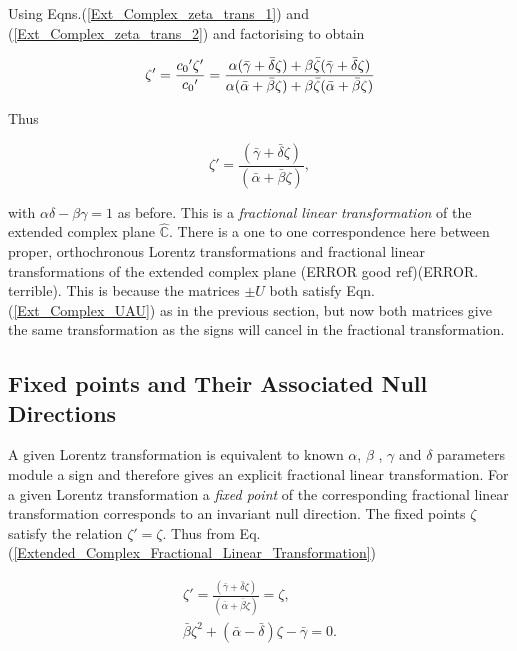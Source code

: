 \noindent Using Eqns.(\ref{Ext_Complex_zeta_trans_1}) and (\ref{Ext_Complex_zeta_trans_2}) and factorising to obtain

\begin{equation*}
\zeta' = \frac{{c_0}'\zeta'}{{c_0}'} = \frac{\alpha(\bar{\gamma} + \bar{\delta}\zeta) + \beta \bar{\zeta}(\bar{\gamma} + \bar{\delta}\zeta)}{\alpha(\bar{\alpha} + \bar{\beta}\zeta) + \beta \bar{\zeta}(\bar{\alpha} + \bar{\beta}\zeta)} \\
\end{equation*}

\noindent Thus 

\begin{equation}\label{Extended_Complex_Fractional_Linear_Transformation}
\zeta' = \frac{(\bar{\gamma} + \bar{\delta}\zeta)}{(\bar{\alpha} + \bar{\beta}\zeta)},
\end{equation}

\noindent with $\alpha\delta - \beta\gamma = 1$ as before. This is a \textit{fractional linear transformation} of the extended complex plane $\hat{\mathbb{C}}$. There is a one to one correspondence here between proper, orthochronous Lorentz transformations and fractional linear transformations of the extended complex plane \cite[p. 9-10]{Hypersurfaces_Hogan_Barrabes}(ERROR good ref)\cite[p. 102]{Relativity_Synge}(ERROR. terrible). This is because the matrices $\pm U$ both satisfy Eqn.(\ref{Ext_Complex_UAU}) as in the previous section, but now both matrices give the same transformation as the signs will cancel in the fractional transformation.

\subsection{Fixed points and Their Associated Null Directions}

A given Lorentz transformation is equivalent to known $\alpha$, $\beta$ , $\gamma$ and $\delta$ parameters module a sign and therefore gives an explicit fractional linear transformation. For a given Lorentz transformation a \textit{fixed point} of the corresponding fractional linear transformation corresponds to an invariant null direction. The fixed points $\zeta$ satisfy the relation $\zeta' = \zeta$. Thus from Eq.(\ref{Extended_Complex_Fractional_Linear_Transformation})

\begin{gather}\nonumber
\zeta' = \frac{(\bar{\gamma} + \bar{\delta}\zeta)}{(\bar{\alpha} + \bar{\beta}\zeta)} = \zeta, \\\label{Ext_Complex_fixed_point}
\bar{\beta}\zeta^2 + (\bar{\alpha}- \bar{\delta})\zeta - \bar{\gamma} = 0. 
\end{gather}

